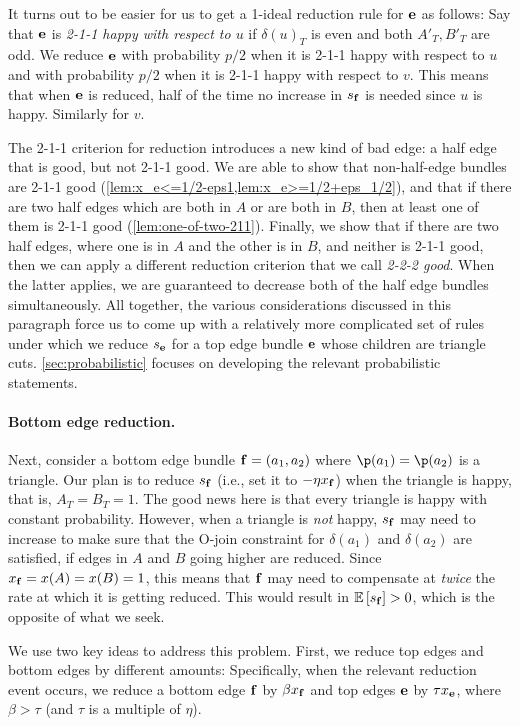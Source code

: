 It turns out to be easier for us to get a 1-ideal reduction rule for ${\bf e}$ as follows: Say that
${\bf e}$ is {\em 2-1-1 happy with respect to $u$} if  $\delta(u)_T$ is even and both $A'_T, B'_T$ are odd. We reduce ${\bf e}$ with probability $p/2$ when it is 2-1-1 happy with respect to $u$ and with probability $p/2$ when it is 2-1-1 happy with respect to $v$. This means that when ${\bf e}$ is reduced, half of the time no increase in $s_{\bf f}$ is needed since $u$ is happy. Similarly for $v$. 
 

The 2-1-1 criterion for reduction introduces a new kind of bad edge: a half edge that is good, but not 2-1-1 good. We are able to show that non-half-edge bundles are 2-1-1 good (\cref{lem:x_e<=1/2-eps1,lem:x_e>=1/2+eps_1/2}), and that if there are two half edges which are both in $A$ or are both in $B$, then at least one of them is 2-1-1 good (\cref{lem:one-of-two-211}). Finally, we show that if there are two half edges, where one is in  $A$ and the other is in $B$, and neither is 2-1-1 good, then we can apply a different reduction criterion that we call {\em 2-2-2 good}. When the latter applies, we are guaranteed to decrease both of the half edge bundles simultaneously.
All together, the various considerations discussed in this paragraph force us to come up with a relatively more complicated set of rules under which we reduce $s_{\bf e}$ for a top edge bundle ${\bf e}$ whose children are triangle cuts. \cref{sec:probabilistic} focuses on developing the relevant probabilistic statements.


\paragraph{Bottom edge reduction.} Next, consider a bottom edge bundle ${\bf f} = (a_1,a_2)$ where $\p(a_1) = \p(a_2)$ is a triangle. Our plan is to reduce $s_{\bf f}$ (i.e., set it to $-\eta x_{\bf f}$) when the triangle is happy, that is, $A_T = B_T = 1$. The good news here is that every triangle is happy with constant probability. However, when a triangle is {\em not} happy, $s_{\bf f}$ may need to increase to make sure that the O-join constraint for $\delta(a_1)$ and $\delta(a_2)$  are satisfied, if
 edges in $A$ and $B$ going higher are reduced. Since  $x_{\bf f} = x(A) = x(B) = 1$, this means that ${\bf f}$ may need to compensate at {\em twice} the rate at which it is getting reduced. This would result in ${\mathbb{E}}\left[s_{\bf f}\right]>0$, which is the opposite of what we seek.
 
 We use two key ideas to address this problem.  First, we reduce top edges and bottom edges by different amounts: Specifically, when the relevant reduction event occurs, we reduce a bottom edge ${\bf f}$  by $\beta x_{\bf f}$ and top edges ${\bf e}$ by $\tau x_{\bf e}$, where $\beta >   \tau$ (and $\tau$ is a multiple of $\eta$). 

